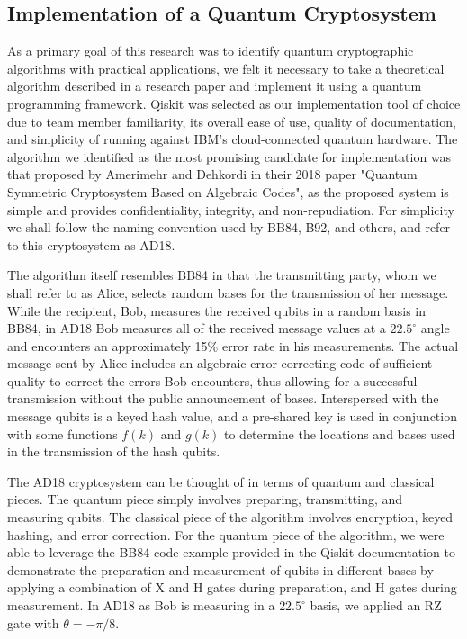 \documentclass[sigconf]{acmart}
\begin{document}
\subsection{Implementation of a Quantum Cryptosystem}
As a primary goal of this research was to identify quantum cryptographic algorithms with practical applications, we felt it necessary to take a theoretical algorithm described in a research paper and implement it using a quantum programming framework. Qiskit was selected as our implementation tool of choice due to team member familiarity, its overall ease of use, quality of documentation, and simplicity of running against IBM's cloud-connected quantum hardware. The algorithm we identified as the most promising candidate for implementation was that proposed by Amerimehr and Dehkordi in their 2018 paper "Quantum Symmetric Cryptosystem Based on Algebraic Codes"\cite{amerimehr_quantum_2018}, as the proposed system is simple and provides confidentiality, integrity, and non-repudiation. For simplicity we shall follow the naming convention used by BB84, B92, and others, and refer to this cryptosystem as AD18.

The algorithm itself resembles BB84 in that the transmitting party, whom we shall refer to as Alice, selects random bases for the transmission of her message. While the recipient, Bob, measures the received qubits in a random basis in BB84, in AD18 Bob measures all of the received message values at a $22.5^{\circ}$ angle and encounters an approximately 15\% error rate in his measurements. The actual message sent by Alice includes an algebraic error correcting code of sufficient quality to correct the errors Bob encounters, thus allowing for a successful transmission without the public announcement of bases. Interspersed with the message qubits is a keyed hash value, and a pre-shared key is used in conjunction with some functions $f(k)$ and $g(k)$ to determine the locations and bases used in the transmission of the hash qubits. 

The AD18 cryptosystem can be thought of in terms of quantum and classical pieces. The quantum piece simply involves preparing, transmitting, and measuring qubits. The classical piece of the algorithm involves encryption, keyed hashing, and error correction. For the quantum piece of the algorithm, we were able to leverage the BB84 code example provided in the Qiskit documentation\cite{qiskit_bb84} to demonstrate the preparation and measurement of qubits in different bases by applying a combination of X and H gates during preparation, and H gates during measurement. In AD18 as Bob is measuring in a $22.5^{\circ}$ basis, we applied an RZ gate with $\theta = -\pi/8$.
\end{document}
